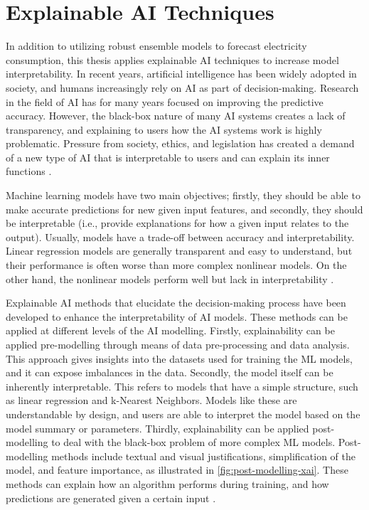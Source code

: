 \section{Explainable AI Techniques}

In addition to utilizing robust ensemble models to forecast electricity consumption, this thesis applies explainable AI techniques to increase model interpretability. In recent years, artificial intelligence has been widely adopted in society, and humans increasingly rely on AI as part of decision-making. Research in the field of AI has for many years focused on improving the predictive accuracy. However, the black-box nature of many AI systems creates a lack of transparency, and explaining to users how the AI systems work is highly problematic. Pressure from society, ethics, and legislation has created a demand of a new type of AI that is interpretable to users and can explain its inner functions %
\cite{minh_explainable_2022,angelov_explainable_2021}.

Machine learning models have two main objectives; firstly, they should be able to make accurate predictions for new given input features, and secondly, they should be interpretable (i.e., provide explanations for how a given input relates to the output). Usually, models have a trade-off between accuracy and interpretability. Linear regression models are generally transparent and easy to understand, but their performance is often worse than more complex nonlinear models. On the other hand, the nonlinear models perform well but lack in interpretability \cite{saarela_comparison_2021}.

Explainable AI methods that elucidate the decision-making process have been developed to enhance the interpretability of AI models. These methods can be applied at different levels of the AI modelling. Firstly, explainability can be applied pre-modelling through means of data pre-processing and data analysis. This approach gives insights into the datasets used for training the ML models, and it can expose imbalances in the data. Secondly, the model itself can be inherently interpretable. This refers to models that have a simple structure, such as linear regression and k-Nearest Neighbors. Models like these are understandable by design, and users are able to interpret the model based on the model summary or parameters. Thirdly, explainability can be applied post-modelling to deal with the black-box problem of more complex ML models. Post-modelling methods include textual and visual justifications, simplification of the model, and feature importance, as illustrated in \autoref{fig:post-modelling-xai}. These methods can explain how an algorithm performs during training, and how predictions are generated given a certain input \cite{minh_explainable_2022,angelov_explainable_2021}.

